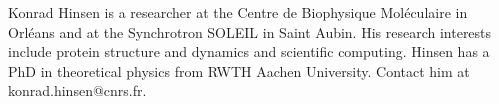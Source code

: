 \documentclass[10pt,journal,compsoc]{IEEEtran}
\begin{document}

\begin{IEEEbiographynophoto}{Konrad Hinsen}
is a researcher at the Centre de Biophysique Mol\'{e}culaire in Orl\'{e}ans and at the Synchrotron SOLEIL in Saint Aubin. His research interests include protein structure and dynamics and scientific computing. Hinsen has a PhD in theoretical physics from RWTH Aachen University. Contact him at konrad.hinsen@cnrs.fr.
\end{IEEEbiographynophoto}
\end{document}
